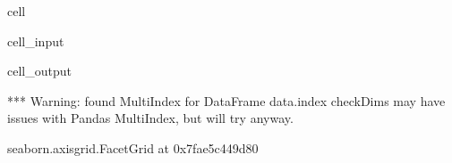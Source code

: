 \documentclass[letterpaper,table,10pt,english]{jupyterBook}
\begin{document}
\begin{sphinxuseclass}{cell}\begin{sphinxVerbatimInput}

\begin{sphinxuseclass}{cell_input}
\begin{sphinxVerbatim}[commandchars=\\\{\}]
  
     
                 
                     
\end{sphinxVerbatim}

\end{sphinxuseclass}\end{sphinxVerbatimInput}
\begin{sphinxVerbatimOutput}

\begin{sphinxuseclass}{cell_output}
\begin{sphinxVerbatim}[commandchars=\\\{\}]
*** Warning: found MultiIndex for DataFrame data.index \PYGZhy{} checkDims may have issues with Pandas MultiIndex, but will try anyway.
\end{sphinxVerbatim}

\begin{sphinxVerbatim}[commandchars=\\\{\}]
\PYGZlt{}seaborn.axisgrid.FacetGrid at 0x7fae5c449d80\PYGZgt{}
\end{sphinxVerbatim}

\noindent{}

\end{sphinxuseclass}\end{sphinxVerbatimOutput}

\end{sphinxuseclass}
\end{document}
